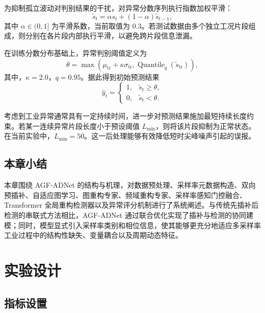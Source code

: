 \documentclass[bachelor, vlined]{DissertUESTC}
\begin{document}
    为抑制孤立波动对判别结果的干扰，对异常分数序列执行指数加权平滑：
    \begin{equation}
        \tilde{s}_t = \alpha s_t + (1-\alpha)\tilde{s}_{t-1},
    \end{equation}
    其中 $\alpha \in (0,1]$ 为平滑系数，当前取值为 $0.3$。若测试数据由多个独立工况片段组成，则分别在各片段内部执行平滑，以避免跨片段信息泄漏。
    
    在训练分数分布基础上，异常判别阈值定义为
    \begin{equation}
        \theta
        =
        \max
        \left(
            \mu_{\mathrm{tr}} + \kappa \sigma_{\mathrm{tr}},
            \operatorname{Quantile}_{q}(\tilde{s}_{\mathrm{tr}})
        \right),
    \end{equation}
    其中，$\kappa=2.0$，$q=0.95$。据此得到初始预测结果
    \begin{equation}
        \hat{y}_t =
        \begin{cases}
            1, & \tilde{s}_t \geq \theta, \\
            0, & \tilde{s}_t < \theta.
        \end{cases}
    \end{equation}
    
    考虑到工业异常通常具有一定持续时间，进一步对预测结果施加最短持续长度约束。若某一连续异常片段长度小于预设阈值 $L_{\min}$，则将该片段抑制为正常状态。在当前实验中，$L_{\min}=50$。这一后处理能够有效降低短时尖峰噪声引起的误报。
    
    \section{本章小结}
    
    本章围绕 AGF-ADNet 的结构与机理，对数据预处理、采样率元数据构造、双向预插补、自适应图学习、图重构专家、频域重构专家、采样率感知门控融合、Transformer 全局重构检测器以及异常评分机制进行了系统阐述。与传统先插补后检测的串联式方法相比，AGF-ADNet 通过联合优化实现了插补与检测的协同建模；同时，模型显式引入采样率类别和相位信息，使其能够更充分地适应多采样率工业过程中的结构性缺失、变量耦合以及周期动态特征。
    

	\chapter{实验设计}

    \section{指标设置}
\end{document}
